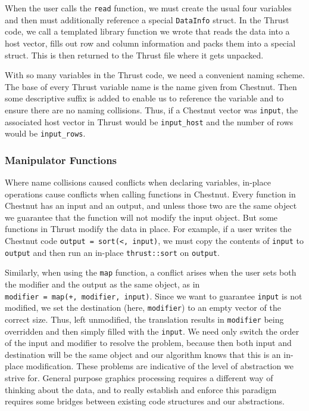 \documentclass[twocolumn]{article}
\renewcommand{\|}{\origbar} %
\newcommand{\code}[1]{\texttt{#1}}
\begin{document}
When the user calls the \code{read} function, we must create the usual four variables and then must additionally reference a special \code{DataInfo} struct. In the Thrust code, we call a templated library function we wrote that reads the data into a host vector, fills out row and column information and packs them into a special struct. This is then returned to the Thrust file where it gets unpacked.

With so many variables in the Thrust code, we need a convenient naming scheme. The base of every Thrust variable name is the name given from Chestnut. Then some descriptive suffix is added to enable us to reference the variable and to ensure there are no naming collisions. Thus, if a Chestnut vector was \code{input}, the associated host vector in Thrust would be \code{input\_host} and the number of rows would be \code{input\_rows}.

\subsubsection{Manipulator Functions}

Where name collisions caused conflicts when declaring variables, in-place operations cause conflicts when calling functions in Chestnut. Every function in Chestnut has an input and an output, and unless those two are the same object we guarantee that the function will not modify the input object. But some functions in Thrust modify the data in place. For example, if a user writes the Chestnut code \code{output~=~sort(<,~input)}, we must copy the contents of \code{input} to \code{output} and then run an in-place \code{thrust::sort} on \code{output}. 

Similarly, when using the \code{map} function, a conflict arises when the user sets both the modifier and the output as the same object, as in \code{modifier~=~map(+,~modifier,~input)}. Since we want to guarantee \code{input} is not modified, we set the destination (here, \code{modifier}) to an empty vector of the correct size. Thus, left unmodified, the translation results in \code{modifier} being overridden and then simply filled with the \code{input}. We need only switch the order of the input and modifier to resolve the problem, because then both input and destination will be the same object and our algorithm knows that this is an in-place modification. These problems are indicative of the level of abstraction we strive for. General purpose graphics processing requires a different way of thinking about the data, and to really establish and enforce this paradigm requires some bridges between existing code structures and our abstractions.
\end{document}
